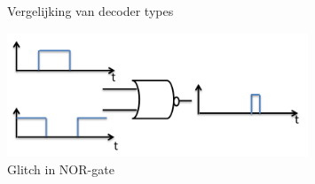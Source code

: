 \begin{figure}[!ht]
\centering
{}
\caption{Vergelijking van decoder types}
\end{figure}



\begin{figure}[!ht]
  \centering
  \includegraphics[width=0.8\textwidth]{../fig/hfdst-decoders-glitch.png}
  \caption{Glitch in NOR-gate}
  \label{fig:decoder_glitch}
\end{figure}


